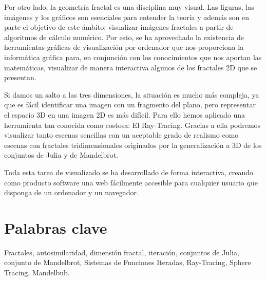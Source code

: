 Por otro lado, la geometría fractal es una disciplina muy visual. Las figuras, las imágenes y los gráficos son esenciales para entender la teoría y además son en parte el objetivo de este ámbito: visualizar imágenes fractales a partir de algoritmos de cálculo numérico. Por esto, se ha aprovechado la existencia de herramientas gráficas de visualización por ordenador que nos proporciona la informática gráfica para, en conjunción con los conocimientos que nos aportan las matemáticas, visualizar de manera interactiva algunos de los fractales 2D que se presentan. 

Si damos un salto a las tres dimensiones, la situación es mucho más compleja, ya que es fácil identificar una imagen con un fragmento del plano, pero representar el espacio 3D en una imagen 2D es más difícil. Para ello hemos aplicado una herramienta tan conocida como costosa: El Ray-Tracing. Gracias a ella podremos visualizar tanto escenas sencillas con un aceptable grado de realismo como escenas con fractales tridimensionales originados por la generalización a 3D de los conjuntos de Julia y de Mandelbrot.

Toda esta tarea de visualizado se ha desarrollado de forma interactiva, creando como producto software una web fácilmente accesible para cualquier usuario que disponga de un ordenador y un navegador.

\section*{Palabras clave}

Fractales, autosimilaridad, dimensión fractal, iteración, conjuntos de Julia, conjunto de Mandelbrot, Sistemas de Funciones Iteradas, Ray-Tracing, Sphere Tracing, Mandelbub. 